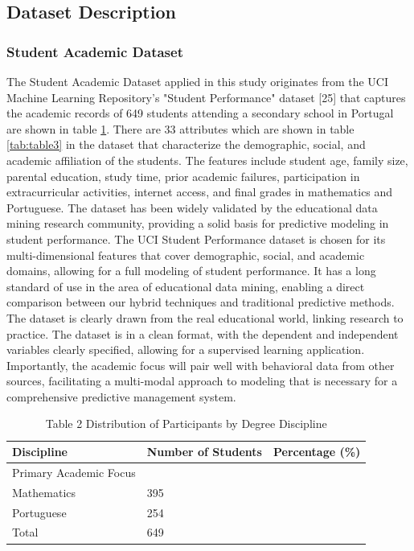 \documentclass[twocolumn]{svjour3}
\begin{document}
\subsection{Dataset Description}
\subsubsection{Student Academic Dataset}
The Student Academic Dataset applied in this study originates from the UCI Machine Learning Repository's "Student Performance" dataset [25] that captures the academic records of 649 students attending a secondary school in Portugal are shown in table \ref{tab:table2}. There are 33 attributes which are shown in table \ref{tab:table3} in the dataset that characterize the demographic, social, and academic affiliation of the students. The features include student age, family size, parental education, study time, prior academic failures, participation in extracurricular activities, internet access, and final grades in mathematics and Portuguese. The dataset has been widely validated by the educational data mining research community, providing a solid basis for predictive modeling in student performance. The UCI Student Performance dataset is chosen for its multi-dimensional features that cover demographic, social, and academic domains, allowing for a full modeling of student performance. It has a long standard of use in the area of educational data mining, enabling a direct comparison between our hybrid techniques and traditional predictive methods. The dataset is clearly drawn from the real educational world, linking research to practice. The dataset is in a clean format, with the dependent and independent variables clearly specified, allowing for a supervised learning application. Importantly, the academic focus will pair well with behavioral data from other sources, facilitating a multi-modal approach to modeling that is necessary for a comprehensive predictive management system.
\begin{table}[h]
\centering
\caption{Table 2 Distribution of Participants by Degree Discipline}
\label{tab:table2}
\begin{tabular}{lll}
\hline
Discipline & Number of Students & Percentage (\%) \\
\hline
Primary Academic Focus & & \\
Mathematics & 395 & \\
Portuguese & 254 & \\
Total & 649 & \\
\hline
\end{tabular}
\end{table}
\end{document}
